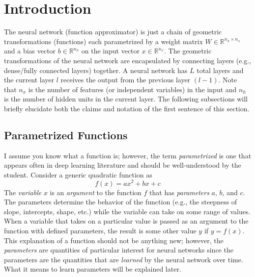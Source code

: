 \documentclass{article}
\begin{document}
\section{Introduction}

\quad The neural network (function approximator) is just a chain of geometric transformations (functions)
each parametrized by a weight matrix $W \in \mathbb{R}^{n_h \times n_x}$ and
a bias vector $b \in \mathbb{R}^{n_h}$ on the input vector $x \in \mathbb{R}^{n_x}$.
The geometric transformations of the neural network are encapsulated by connecting
layers (e.g., dense/fully connected layers) together. A neural network has $L$ total
layers and the current layer $l$ receives the output from the previous layer $(l-1)$.
Note that $n_x$ is the number of features (or independent variables) in the input
and $n_h$ is the number of hidden units in the current layer. The following subsections will
briefly elucidate both the claims and notation of the first sentence of this section.

\subsection{Parametrized Functions}

\quad I assume you know what a function is; however, the term \textit{parametrized}
is one that appears often in deep learning literature and should be well-understood by the student.
Consider a generic quadratic function \cite{MathSEVarsParamsArgs2015} as
\begin{equation}
	f(x) = ax^{2} + bx + c
\end{equation}
The \textit{variable} $x$ is an \textit{argument} to the function $f$ that has
\textit{parameters} $a$, $b$, and $c$. The parameters determine the behavior of
the function (e.g., the steepness of slope, intercepts, shape, etc.) while the
variable can take on some range of values. When a variable that takes on a particular
value is passed as an argument to the function with defined parameters, the result
is some other value $y$ if $y = f(x)$. This explanation of a function
should not be anything new; however, the \textit{parameters} are quantities
of particular interest for neural networks since the parameters are the quantities
that are \textit{learned} by the neural network over time. What it means to learn
parameters will be explained later.
\end{document}
